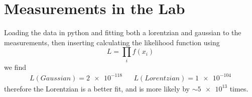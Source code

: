 \clearpage
\section{Measurements in the Lab}
Loading the data in python and fitting both a lorentzian and gaussian to the measurements, then inserting calculating the likelihood function using 
\begin{equation}
	L = \prod_{i} f(x_i)
\end{equation}
we find 
\begin{align}
	L(Gaussian) = \num{2e-118} && L(Lorentzian) = \num{1e-104}
\end{align}
therefore the Lorentzian is a better fit, and is more likely by \(\sim\num{5e13}\) times.